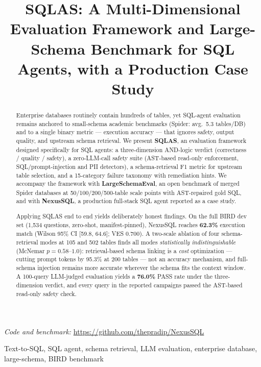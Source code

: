 \documentclass[conference]{IEEEtran}
\title{SQLAS: A Multi-Dimensional Evaluation Framework and Large-Schema
Benchmark for SQL Agents, with a Production Case Study}
\author{
  \IEEEauthorblockN{Pradip Tivhale}
  \IEEEauthorblockA{Independent Researcher\\
    Email: pradiptivhale@gmail.com}
}
\begin{document}
\maketitle

\begin{abstract}
Enterprise databases routinely contain hundreds of tables, yet SQL-agent
evaluation remains anchored to small-schema academic benchmarks (Spider:
avg.\ 5.3 tables/DB) and to a single binary metric --- execution accuracy
--- that ignores safety, output quality, and upstream schema retrieval.
We present \textbf{SQLAS}, an evaluation framework designed specifically
for SQL agents: a three-dimension AND-logic verdict (correctness /
quality / safety), a zero-LLM-call safety suite (AST-based read-only
enforcement, SQL/prompt-injection and PII detectors), a schema-retrieval
F1 metric for upstream table selection, and a 15-category failure
taxonomy with remediation hints. We accompany the framework with
\textbf{LargeSchemaEval}, an open benchmark of merged Spider databases
at 50/100/200/500-table scale points with AST-repaired gold SQL, and
with \textbf{NexusSQL}, a production full-stack SQL agent reported as a
case study.

Applying SQLAS end to end yields deliberately honest findings. On the
full BIRD dev set (1{,}534 questions, zero-shot, manifest-pinned),
NexusSQL reaches \textbf{62.3\%} execution match (Wilson 95\% CI
[59.8, 64.6]; VES 0.700). A two-scale ablation of four schema-retrieval
modes at 105 and 502 tables finds all modes \emph{statistically
indistinguishable} (McNemar $p = 0.58$--$1.0$): retrieval-based schema
linking is a \emph{cost} optimization --- cutting prompt tokens by
95.3\% at 200 tables --- not an accuracy mechanism, and full-schema
injection remains more accurate wherever the schema fits the context
window. A 100-query LLM-judged evaluation yields a \textbf{76.0\%} PASS
rate under the three-dimension verdict, and every query in the reported
campaigns passed the AST-based read-only safety check.
\end{abstract}

\noindent\textit{Code and benchmark:} \url{https://github.com/thepradip/NexusSQL}

\begin{IEEEkeywords}
Text-to-SQL, SQL agent, schema retrieval, LLM evaluation, enterprise database, large-schema, BIRD benchmark
\end{IEEEkeywords}
\end{document}

